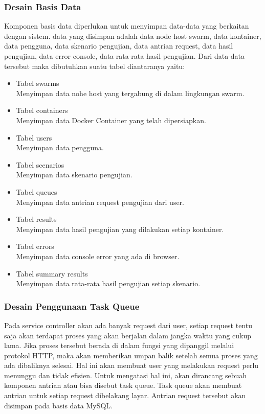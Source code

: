 	   		\subsubsection{Desain Basis Data}
	   			Komponen basis data diperlukan untuk menyimpan data-data yang berkaitan dengan sistem. data yang disimpan adalah data node host swarm, data kontainer, data pengguna, data skenario pengujian, data antrian request, data hasil pengujian, data error console, data rata-rata hasil pengujian. Dari data-data tersebut maka dibutuhkan suatu tabel diantaranya yaitu:
	   			\begin{itemize}
	   				\item Tabel swarms \\
	   					Menyimpan data nohe host yang tergabung di dalam lingkungan swarm.
	   				\item Tabel containers \\
	   					Menyimpan data Docker Container yang telah dipersiapkan.
	   				\item Tabel users \\
	   					Menyimpan data pengguna.
	   				\item Tabel scenarios \\
	   					Menyimpan data skenario pengujian.
	   				\item Tabel queues \\
		   				Menyimpan data antrian request pengujian dari user.
	   				\item Tabel results \\
	   					Menyimpan data hasil pengujian yang dilakukan setiap kontainer.
	   				\item Tabel errors \\
	   					Menyimpan data console error yang ada di browser.
	   				\item Tabel summary results \\
	   					Menyimpan data rata-rata hasil pengujian setiap skenario.
	   			\end{itemize}
	    		
	    	\subsubsection{Desain Penggunaan Task Queue}
	    		Pada service controller akan ada banyak request dari user, setiap request tentu saja akan terdapat proses yang akan berjalan dalam jangka waktu yang cukup lama. Jika proses tersebut berada di dalam fungsi yang dipanggil melalui protokol HTTP, maka akan memberikan umpan balik setelah semua proses yang ada dibaliknya selesai. Hal ini akan membuat user yang melakukan request perlu menunggu dan tidak efisien. Untuk mengatasi hal ini, akan dirancang sebuah komponen antrian atau bisa disebut task queue. Task queue akan membuat antrian untuk setiap request dibelakang layar. Antrian request tersebut akan disimpan pada basis data MySQL.